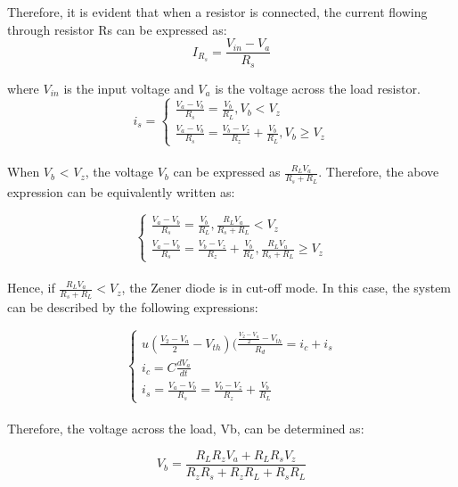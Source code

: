 Therefore, it is evident that when a resistor is connected, the current flowing through resistor Rs can be expressed as:
\begin{equation}
    I_{R_s} = \frac{V_{in} - V_a}{R_s}
\end{equation}


where $V_{in}$ is the input voltage and $V_a$ is the voltage across the load resistor.\\

\begin{equation}
    i_s=\begin{cases}
        \frac{V_a-V_b}{R_s}=\frac{V_b}{R_L},  V_b<V_z\\
        \frac{V_a-V_b}{R_s}=\frac{V_b-V_z}{R_z}+\frac{V_b}{R_L},  V_b \geq V_z
    \end{cases}
\end{equation}\\

When $V_b$ < $V_z$, the voltage $V_b$ can be expressed as $\frac{R_LV_a}{R_s+R_L}$. Therefore, the above expression can be equivalently written as:

\begin{equation}
    \begin{cases}
        \frac{V_a-V_b}{R_s}=\frac{V_b}{R_L}, \frac{R_LV_a}{R_s+R_L}<V_z\\
        \frac{V_a-V_b}{R_s}=\frac{V_b-V_z}{R_z}+\frac{V_b}{R_L}, \frac{R_LV_a}{R_s+R_L} \geq V_z
    \end{cases}
\end{equation}\\

Hence, if $\frac{R_LV_a}{R_s+R_L}<V_z$, the Zener diode is in cut-off mode. In this case, the system can be described by the following expressions:

\begin{equation}
    \begin{cases}
        u(\frac{V_2-V_a}{2}-V_{th})(\frac{\frac{V_2-V_a}{2}-V_{th}}{R_d}=i_c+i_s\\
        i_c=C\frac{dV_a}{dt}\\
        i_s=\frac{V_a-V_b}{R_s}=\frac{V_b-V_z}{R_z}+\frac{V_b}{R_L}
    \end{cases}
\end{equation}\\

Therefore, the voltage across the load, Vb, can be determined as:

\begin{equation}
    V_b=\frac{R_LR_zV_a+R_LR_sV_z}{R_zR_s+R_zR_L+R_sR_L}
\end{equation}

